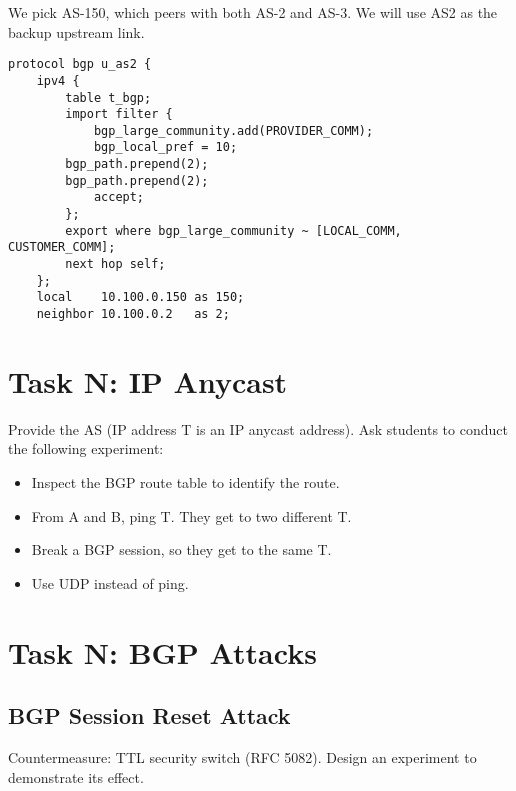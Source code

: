 We pick AS-150, which peers with both AS-2 and AS-3. 
We will use AS2 as the backup upstream link.

\begin{lstlisting}
protocol bgp u_as2 {
    ipv4 {
        table t_bgp;
        import filter {
            bgp_large_community.add(PROVIDER_COMM);
            bgp_local_pref = 10;
	    bgp_path.prepend(2);
	    bgp_path.prepend(2);
            accept;
        };
        export where bgp_large_community ~ [LOCAL_COMM, CUSTOMER_COMM];
        next hop self;
    };
    local    10.100.0.150 as 150;
    neighbor 10.100.0.2   as 2;
\end{lstlisting}
 


\section{Task N: IP Anycast} 

Provide the AS (IP address T is an IP anycast address). 
Ask students to conduct the following experiment:

\begin{itemize}
  \item Inspect the BGP route table to identify the route.
  \item From A and B, ping T. They get to two different T.
  \item Break a BGP session, so they get to the same T.
  \item Use UDP instead of ping.
\end{itemize}
 


\section{Task N: BGP Attacks} 


\subsection{BGP Session Reset Attack} 



Countermeasure: TTL security switch (RFC 5082).
Design an experiment to demonstrate its effect.

